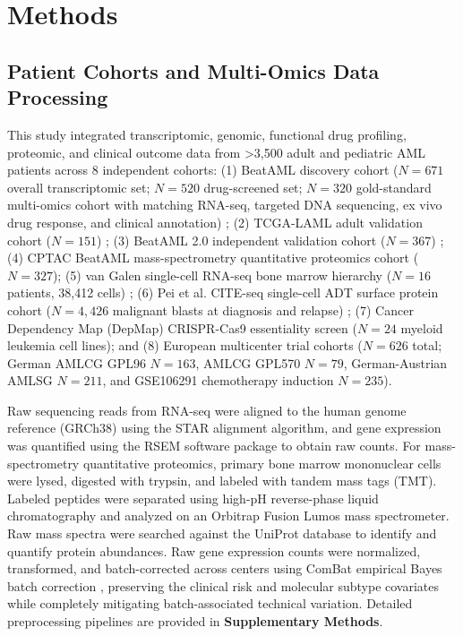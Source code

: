 \documentclass[11pt,a4paper]{article}
\begin{document}
\section{Methods}
\subsection{Patient Cohorts and Multi-Omics Data Processing}
This study integrated transcriptomic, genomic, functional drug profiling, proteomic, and clinical outcome data from >3,500 adult and pediatric AML patients across 8 independent cohorts: (1) BeatAML discovery cohort ($N=671$ overall transcriptomic set; $N=520$ drug-screened set; $N=320$ gold-standard multi-omics cohort with matching RNA-seq, targeted DNA sequencing, ex vivo drug response, and clinical annotation) \cite{tyner2018beataml}; (2) TCGA-LAML adult validation cohort ($N=151$) \cite{cancer2013tcga}; (3) BeatAML 2.0 independent validation cohort ($N=367$) \cite{bottomly2022,bottomly2022beataml}; (4) CPTAC BeatAML mass-spectrometry quantitative proteomics cohort ($N=327$); (5) van Galen single-cell RNA-seq bone marrow hierarchy ($N=16$ patients, 38,412 cells) \cite{vangalen2019single}; (6) Pei et al. CITE-seq single-cell ADT surface protein cohort ($N=4,426$ malignant blasts at diagnosis and relapse) \cite{pei2020monocytic}; (7) Cancer Dependency Map (DepMap) CRISPR-Cas9 essentiality screen ($N=24$ myeloid leukemia cell lines); and (8) European multicenter trial cohorts ($N=626$ total; German AMLCG GPL96 $N=163$, AMLCG GPL570 $N=79$, German-Austrian AMLSG $N=211$, and GSE106291 chemotherapy induction $N=235$).

Raw sequencing reads from RNA-seq were aligned to the human genome reference (GRCh38) using the STAR alignment algorithm, and gene expression was quantified using the RSEM software package to obtain raw counts. For mass-spectrometry quantitative proteomics, primary bone marrow mononuclear cells were lysed, digested with trypsin, and labeled with tandem mass tags (TMT). Labeled peptides were separated using high-pH reverse-phase liquid chromatography and analyzed on an Orbitrap Fusion Lumos mass spectrometer. Raw mass spectra were searched against the UniProt database to identify and quantify protein abundances. Raw gene expression counts were normalized, transformed, and batch-corrected across centers using ComBat empirical Bayes batch correction \cite{johnson2007combat}, preserving the clinical risk and molecular subtype covariates while completely mitigating batch-associated technical variation. Detailed preprocessing pipelines are provided in \textbf{Supplementary Methods}.
\end{document}
